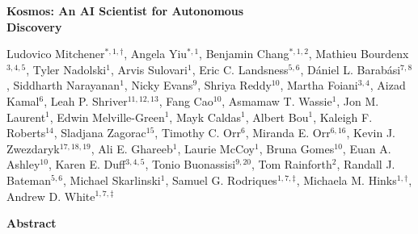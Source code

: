 \documentclass{article}
\newenvironment{headerbox}{
  \begin{tcolorbox}[
    colback=edisongray,      %
    colframe=edisongray,     %
    frame hidden,           %
    arc=4mm,                %
    boxrule=0pt,            %
    boxsep=0pt,             %
    left=15pt, right=15pt, top=10pt, bottom=15pt,
    nobeforeafter
  ]
}{
  \end{tcolorbox}
}
\begin{document}
\begin{center}
\begin{headerbox}
  \vspace*{1em} %
    {\sffamily \textbf{\huge Kosmos: An AI Scientist for Autonomous\\[7pt] Discovery}}
      
    \vspace{1em}
    {Ludovico Mitchener$^{*,1,\dagger}$, Angela Yiu$^{*,1}$, Benjamin Chang$^{*,1,2}$, Mathieu Bourdenx$^{3,4,5}$, Tyler Nadolski$^{1}$, Arvis Sulovari$^{1}$, Eric C. Landsness$^{5,6}$, Dániel L. Barabási$^{7,8}$, Siddharth Narayanan$^{1}$, Nicky Evans$^{9}$, Shriya Reddy$^{10}$, Martha Foiani$^{3,4}$, Aizad Kamal$^{6}$, Leah P. Shriver$^{11,12,13}$, Fang Cao$^{10}$, Asmamaw T. Wassie$^{1}$, Jon M. Laurent$^{1}$, Edwin Melville-Green$^{1}$, Mayk Caldas$^{1}$, Albert Bou$^{1}$, Kaleigh F. Roberts$^{14}$, Sladjana Zagorac$^{15}$, Timothy C. Orr$^{6}$, Miranda E. Orr$^{6,16}$, Kevin J. Zwezdaryk$^{17,18,19}$, Ali E. Ghareeb$^{1}$, Laurie McCoy$^{1}$, Bruna Gomes$^{10}$, Euan A. Ashley$^{10}$, Karen E. Duff$^{3,4,5}$, Tonio Buonassisi$^{9,20}$, Tom Rainforth$^{2}$, Randall J. Bateman$^{5,6}$, Michael Skarlinski$^{1}$, Samuel G. Rodriques$^{1,7,\ddagger}$, Michaela M. Hinks$^{1,\dagger}$, Andrew D. White$^{1,7,\ddagger}$}
    \vspace{1em}
    
    \sffamily \textbf{\large Abstract}

    \vspace{0.2em}
    

\end{headerbox}
\end{center}
\end{document}

